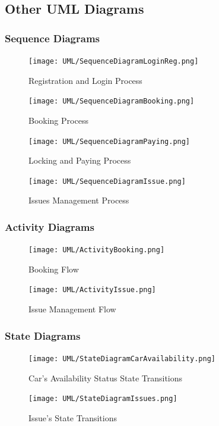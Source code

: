 \documentclass[11pt]{article} %
\begin{document}
\subsection{Other UML Diagrams}

\subsubsection{Sequence Diagrams}
\begin{figure}[H]
	\centering
	\texttt{[image: UML/SequenceDiagramLoginReg.png]}
	\caption{Registration and Login Process}
\end{figure}
\begin{figure}[H]
	\centering
	\texttt{[image: UML/SequenceDiagramBooking.png]}
	\caption{Booking Process}
\end{figure}
\begin{figure}[H]
	\centering
	\texttt{[image: UML/SequenceDiagramPaying.png]}
	\caption{Locking and Paying Process}
\end{figure}
\begin{figure}[H]
	\centering
	\texttt{[image: UML/SequenceDiagramIssue.png]}
	\caption{Issues Management Process}
\end{figure}

\subsubsection{Activity Diagrams}
\begin{figure}[H]
	\centering
	\texttt{[image: UML/ActivityBooking.png]}
	\caption{Booking Flow}
\end{figure}

\begin{figure}[H]
	\centering
	\texttt{[image: UML/ActivityIssue.png]}
	\caption{Issue Management Flow}
\end{figure}
\newpage


\subsubsection{State Diagrams}
\begin{figure}[H]
	\centering
	\texttt{[image: UML/StateDiagramCarAvailability.png]}
	\caption{Car's Availability Status State Transitions}
\end{figure}
\begin{figure}[H]
	\centering
	\texttt{[image: UML/StateDiagramIssues.png]}
	\caption{Issue's State Transitions}
\end{figure}
\end{document}
